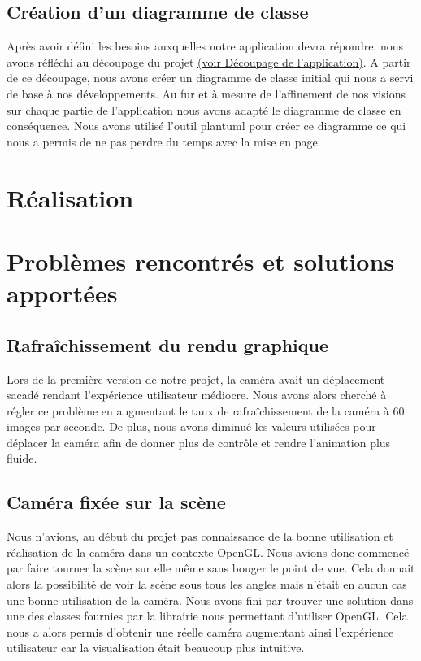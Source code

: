 \documentclass[11pt]{report}
\begin{document}
\subsection{Création d'un diagramme de classe}

Après avoir défini les besoins auxquelles notre application devra répondre, nous avons réfléchi au découpage du projet \hyperlink{découpage}{(voir Découpage de l'application)}.
A partir de ce découpage, nous avons créer un diagramme de classe initial qui nous a servi de base à nos développements. 
Au fur et à mesure de l'affinement de nos visions sur chaque partie de l'application nous avons adapté le diagramme de classe en conséquence.
Nous avons utilisé l'outil plantuml pour créer ce diagramme ce qui nous a permis de ne pas perdre du temps avec la mise en page.

\section{Réalisation}

\section{Problèmes rencontrés et solutions apportées}

\subsection{Rafraîchissement du rendu graphique}

Lors de la première version de notre projet, la caméra avait un déplacement sacadé rendant l'expérience utilisateur médiocre. Nous avons alors
cherché à régler ce problème en augmentant le taux de rafraîchissement de la caméra à 60 images par seconde. De plus, nous avons diminué
les valeurs utilisées pour déplacer la caméra afin de donner plus de contrôle et rendre l'animation plus fluide.

\subsection{Caméra fixée sur la scène}

Nous n'avions, au début du projet pas connaissance de la bonne utilisation et réalisation de la caméra dans un contexte OpenGL. Nous avions
donc commencé par faire tourner la scène sur elle même sans bouger le point de vue. Cela donnait alors la possibilité de voir la scène sous tous les angles mais n'était en aucun cas une bonne utilisation de la caméra. Nous avons fini par trouver une solution dans une des classes fournies par la librairie nous permettant d'utiliser OpenGL. Cela nous a alors permis d'obtenir une réelle caméra augmentant ainsi l'expérience utilisateur car la visualisation était beaucoup plus intuitive.
\end{document}
